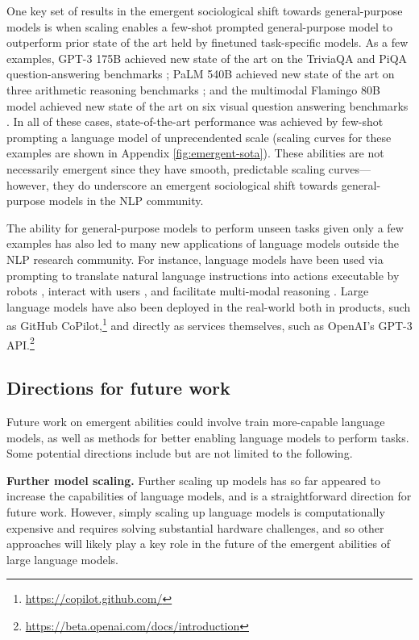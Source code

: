 One key set of results in the emergent sociological shift towards general-purpose models is when scaling enables a few-shot prompted general-purpose model to outperform prior state of the art held by finetuned task-specific models. As a few examples, GPT-3 175B achieved new state of the art on the TriviaQA and PiQA question-answering benchmarks \citep{brown2020language}; PaLM 540B achieved new state of the art on three arithmetic reasoning benchmarks \citep{chowdhery2022palm}; and the multimodal Flamingo 80B model achieved new state of the art on six visual question answering benchmarks \citep{alayrac2022flamingo}. In all of these cases, state-of-the-art performance was achieved by few-shot prompting a language model of unprecendented scale (scaling curves for these examples are shown in Appendix \ref{fig:emergent-sota}).
These abilities are not necessarily emergent since they have smooth, predictable scaling curves---however, they do underscore an emergent sociological shift towards general-purpose models in the NLP community.

The ability for general-purpose models to perform unseen tasks given only a few examples has also led to many new applications of language models outside the NLP research community. For instance, language models have been used via prompting to translate natural language instructions into actions executable by robots \citep{ahn2022can,huang2022language}, interact with users \citep{coenen2021wordcraft,wu2021ai,wu2022promptchainer,lee2022coauthor}, and facilitate multi-modal reasoning \citep{zeng2022socratic,alayrac2022flamingo}. Large language models have also been deployed in the real-world both in products, such as GitHub CoPilot,\footnote{\scriptsize \url{https://copilot.github.com/}} and directly as services themselves, such as OpenAI's GPT-3 API.\footnote{\scriptsize \url{https://beta.openai.com/docs/introduction}}

\subsection{Directions for future work}

Future work on emergent abilities could involve train more-capable language models, as well as methods for better enabling language models to perform tasks. Some potential directions include but are not limited to the following.

\textbf{Further model scaling.} Further scaling up models has so far appeared to increase the capabilities of language models, and is a straightforward direction for future work. However, simply scaling up language models is computationally expensive and requires solving substantial hardware challenges, and so other approaches will likely play a key role in the future of the emergent abilities of large language models.

